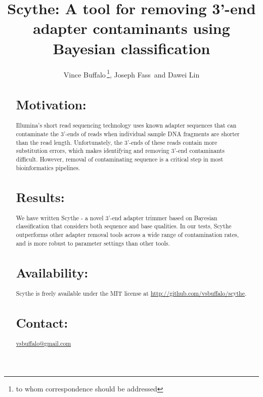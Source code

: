 \documentclass{bioinfo}
\begin{document}

\title[Scythe]{Scythe: A tool for removing 3'-end adapter contaminants using Bayesian classification}
\author[Buffalo \textit{et~al}]{Vince Buffalo\,\footnote{to whom correspondence should be addressed}, Joseph Fass\, and Dawei Lin}
\address{Bioinformatics Core, UC Davis Genome Center}



\maketitle

\begin{abstract}

\section{Motivation:}
Illumina's short read sequencing technology uses known adapter
sequences that can contaminate the 3'-ends of reads when individual
sample DNA fragments are shorter than the read length. Unfortunately,
the 3'-ends of these reads contain more substitution errors, which
makes identifying and removing 3'-end contaminants difficult. However,
removal of contaminating sequence is a critical step in most
bioinformatics pipelines.


\section{Results:} 
We have written Scythe - a novel 3'-end adapter trimmer based on
Bayesian classification that considers both sequence and base
qualities. In our tests, Scythe outperforms other adapter removal
tools across a wide range of contamination rates, and is more robust
to parameter settings than other tools.


\section{Availability:}
Scythe is freely available under the MIT license at
\href{http://github.com/vsbuffalo/scythe}{http://github.com/vsbuffalo/scythe}.


\section{Contact:} \href{mailto:vsbuffalo@gmail.com}{vsbuffalo@gmail.com}
\end{abstract}
\end{document}
